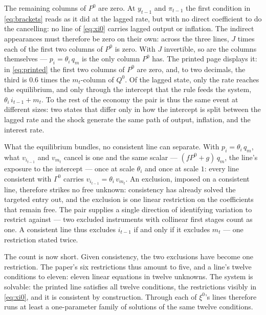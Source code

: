 \documentclass[11pt]{article}
\theoremstyle{remark}
\begin{document}
The remaining columns of $P^0$ are zero. At $y_{t-1}$ and $\pi_{t-1}$ the first condition in \eqref{eq:brackets} reads as it did at the lagged rate, but with no direct coefficient to do the cancelling: no line of \eqref{eq:xi0} carries lagged output or inflation. The indirect appearances must therefore be zero on their own: across the three lines, $J$ times each of the first two columns of $P^0$ is zero. With $J$ invertible, so are the columns themselves --- $p_i=\theta_i\,q_m$ is the only column $P^0$ has. The printed page displays it: in \eqref{eq:printed} the first two columns of $P^0$ are zero, and, to two decimals, the third is $0.6$ times the $m_t$-column of $Q^0$. Of the lagged state, only the rate reaches the equilibrium, and only through the intercept that the rule feeds the system, $\theta_i\,i_{t-1}+m_t$. To the rest of the economy the pair is thus the same event at different sizes: two states that differ only in how the intercept is split between the lagged rate and the shock generate the same path of output, inflation, and the interest rate.

What the equilibrium bundles, no consistent line can separate. With $p_i=\theta_i\,q_m$, what $v_{i_{t-1}}$ and $v_{m_t}$ cancel is one and the same scalar --- $(fP^0+g)\,q_m$, the line's exposure to the intercept --- once at scale $\theta_i$ and once at scale $1$: every line consistent with $\Gamma^0$ carries $v_{i_{t-1}}=\theta_i\,v_{m_t}$. An exclusion, imposed on a consistent line, therefore strikes no free unknown: consistency has already solved the targeted entry out, and the exclusion is one linear restriction on the coefficients that remain free. The pair supplies a single direction of identifying variation to restrict against --- two excluded instruments with collinear first stages count as one. A consistent line thus excludes $i_{t-1}$ if and only if it excludes $m_t$ --- one restriction stated twice.

The count is now short. Given consistency, the two exclusions have become one restriction. The paper's six restrictions thus amount to five, and a line's twelve conditions to eleven: eleven linear equations in twelve unknowns. The system is solvable: the printed line satisfies all twelve conditions, the restrictions visibly in \eqref{eq:xi0}, and it is consistent by construction. Through each of $\xi^0$'s lines therefore runs at least a one-parameter family of solutions of the same twelve conditions.
\end{document}
